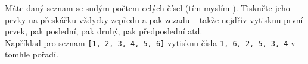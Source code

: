\question[50]
Máte daný seznam se sudým počtem celých čísel (tím myslím ). Tiskněte jeho prvky na přeskáčku vždycky
zepředu a pak zezadu -- takže nejdřív vytisknu první prvek, pak poslední, pak
druhý, pak předposlední atd.\\
Například pro seznam \texttt{[1, 2, 3, 4, 5, 6]} vytisknu čísla \texttt{1, 6, 2,
	5, 3, 4} v tomhle pořadí.